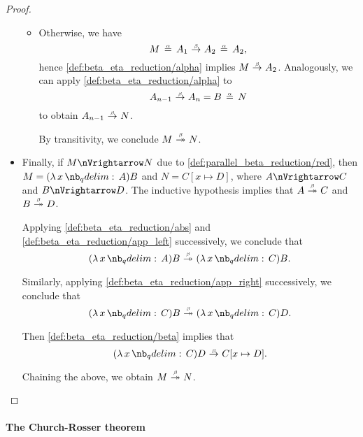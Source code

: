 \begin{proof}
\begin{itemize}
\begin{itemize}
      \item Otherwise, we have
      \begin{equation*}
        M \aequiv A_1 \bred A_2 \aequiv A_2,
      \end{equation*}
      hence \ref{def:beta_eta_reduction/alpha} implies \( M \bred A_2 \). Analogously, we can apply \ref{def:beta_eta_reduction/alpha} to
      \begin{equation*}
        A_{n-1} \bred A_n = B \aequiv N
      \end{equation*}
      to obtain \( A_{n-1} \bred N \).

      By transitivity, we conclude \( M \bred* N \).
    \end{itemize}

    \item Finally, if \( M \pred N \) due to \ref{def:parallel_beta_reduction/red}, then \( M = (\qabs x A)B \) and \( N = C[x \mapsto D] \), where \( A \pred C \) and \( B \pred D \). The inductive hypothesis implies that \( A \bred* C \) and \( B \bred* D \).

    Applying \ref{def:beta_eta_reduction/abs} and \ref{def:beta_eta_reduction/app_left} successively, we conclude that
    \begin{equation*}
      (\qabs x A) B \bred* (\qabs x C) B.
    \end{equation*}

    Similarly, applying \ref{def:beta_eta_reduction/app_right} successively, we conclude that
    \begin{equation*}
      (\qabs x C) B \bred* (\qabs x C) D.
    \end{equation*}

    Then \ref{def:beta_eta_reduction/beta} implies that
    \begin{equation*}
      (\qabs x C) D \bred C[x \mapsto D].
    \end{equation*}

    Chaining the above, we obtain \( M \bred* N \).
  \end{itemize}
\end{proof}

\paragraph{The Church-Rosser theorem}

